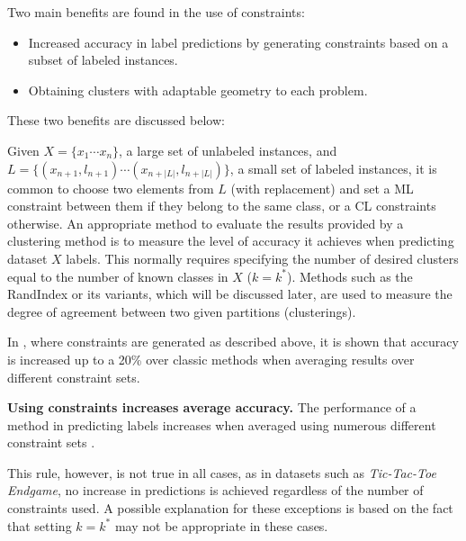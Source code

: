Two main benefits are found in the use of constraints:

\begin{itemize}
	
	\item Increased accuracy in label predictions by generating constraints based on a subset of labeled instances.
	
	\item Obtaining clusters with adaptable geometry to each problem.
	
\end{itemize}

These two benefits are discussed below:

Given $X = \{x_1 \cdots x_n\}$, a large set of unlabeled instances, and $L = \{(x_{n+1}, l_{n+1}) \cdots (x_{n+|L|}, l_{n+|L|})\}$, a small set of labeled instances, it is common to choose two elements from $L$ (with replacement) and set a \acs{ML} constraint between them if they belong to the same class, or a \acs{CL} constraints otherwise. An appropriate method to evaluate the results provided by a clustering method is to measure the level of accuracy it achieves when predicting dataset $X$ labels. This normally requires specifying the number of desired clusters equal to the number of known classes in $X$ ($k = k^*$). Methods such as the RandIndex \cite{rand1971objective} or its variants, which will be discussed later, are used to measure the degree of agreement between two given partitions (clusterings).

In \cite{wagstaff2000clustering}, where constraints are generated as described above, it is shown that accuracy is increased up to a 20\% over classic methods when averaging results over different constraint sets.

\begin{observation}
	
	\textbf{Using constraints increases average accuracy.}
	The performance of a method in predicting labels increases when averaged using numerous different constraint sets \cite{davidson2007survey}.
	\label{ob:AccuracyIncrease}
	
\end{observation}

This rule, however, is not true in all cases, as in datasets such as \textit{Tic-Tac-Toe Endgame}, no increase in predictions is achieved regardless of the number of constraints used. A possible explanation for these exceptions is based on the fact that setting $k = k^*$ may not be appropriate in these cases.

